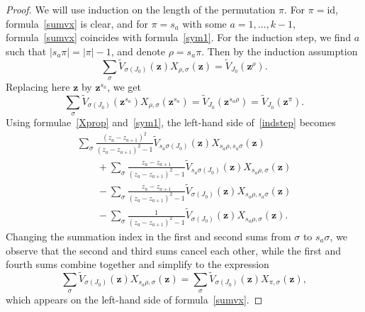 \documentclass[10pt,a4paper]{amsart}
\numberwithin{equation}{section}
\newcommand{\id}{\mathrm{id}}
\begin{document}
\begin{proof}
We will use induction on the length of the permutation $\pi$. For $\pi=\id$, formula~\eqref{sumvx} is clear, and for $\pi=s_a$ with some $a=1,\dots,k-1$, formula~\eqref{sumvx} coincides with formula~\eqref{sym1}. For the induction step, we find $a$ such that $|s_a\pi|=|\pi|-1$, and denote $\rho =s_a\pi$. Then by the induction assumption
\begin{equation*}
\sum_{\sigma} \widetilde{V}_{\sigma(J_0)}(\boldsymbol{z})X_{\rho,\sigma}(\boldsymbol{z})= \widetilde{V}_{J_0}(\boldsymbol{z}^\rho).
\end{equation*}
Replacing here $\boldsymbol{z}$ by $\boldsymbol{z}^{s_a}$, we get
\begin{equation}\label{indstep}
\sum_{\sigma} \widetilde{V}_{\sigma(J_0)}(\boldsymbol{z}^{s_a})X_{\rho,\sigma}(\boldsymbol{z}^{s_a})= \widetilde{V}_{J_0}(\boldsymbol{z}^{s_a\rho})=\widetilde{V}_{J_0}(\boldsymbol{z}^{\pi}).
\end{equation}
Using formulae~\eqref{Xprop} and~\eqref{sym1}, the left-hand side of~\eqref{indstep} becomes
\begin{gather*}
\sum_{\sigma} \frac{(z_a-z_{a+1})^2}{(z_a-z_{a+1})^2-1}\widetilde{V}_{s_a\sigma(J_0)}(\boldsymbol{z})X_{s_a\rho,s_a\sigma}(\boldsymbol{z})\\
\qquad{} +\sum_{\sigma}\frac{z_a-z_{a+1}}{(z_a-z_{a+1})^2-1}\widetilde{V}_{s_a\sigma(J_0)}(\boldsymbol{z})X_{s_a\rho,\sigma}(\boldsymbol{z})\\
\qquad{}- \sum_{\sigma}\frac{z_a-z_{a+1}}{(z_a-z_{a+1})^2-1}\widetilde{V}_{\sigma(J_0)}(\boldsymbol{z})X_{s_a\rho,s_a\sigma}(\boldsymbol{z})\\
\qquad{} -\sum_{\sigma} \frac{1}{(z_a-z_{a+1})^2-1}\widetilde{V}_{\sigma(J_0)}(\boldsymbol{z})X_{s_a\rho, \sigma}(\boldsymbol{z}).
\end{gather*}
Changing the summation index in the first and second sums from $\sigma$ to $s_a\sigma$, we observe that the second and third sums cancel each other, while the first and fourth sums combine together and simplify to the expression
\begin{equation*}
\sum_{\sigma} \widetilde{V}_{\sigma(J_0)}(\boldsymbol{z})X_{s_a\rho,\sigma}(\boldsymbol{z}) =\sum_{\sigma} \widetilde{V}_{\sigma(J_0)}(\boldsymbol{z})X_{\pi,\sigma}(\boldsymbol{z}),
\end{equation*}
which appears on the left-hand side of formula~\eqref{sumvx}.
\end{proof}
\end{document}
